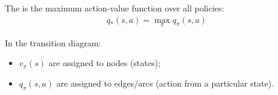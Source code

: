 The   is the maximum action-value function over all policies:
\begin{align*}
	q_*(s, a) = \max_{\pi} q_{\pi}(s, a)
\end{align*}


\begin{notebox}
	In the transition diagram:
	\begin{itemize}
		\item $v_\pi(s)$ are assigned to nodes (states);
		\item $q_\pi(s, a)$ are assigned to edges/arcs (action from a particular state).
	\end{itemize}
\end{notebox}

